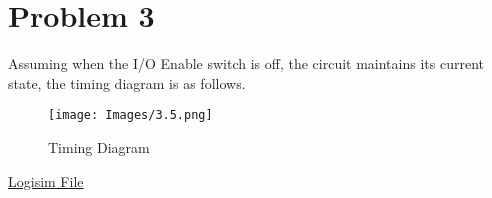 \section*{Problem 3}
Assuming when the I/O Enable switch is off, the circuit maintains its current state, the timing diagram is as follows.
\begin{figure}[!ht]
    \centering
    \texttt{[image: Images/3.5.png]}
    \caption{Timing Diagram}
\end{figure}

\noindent
\href{https://raw.githubusercontent.com/lai-huy/CSCE-312/master/Lab\%203/Problem3.circ}{Logisim File}